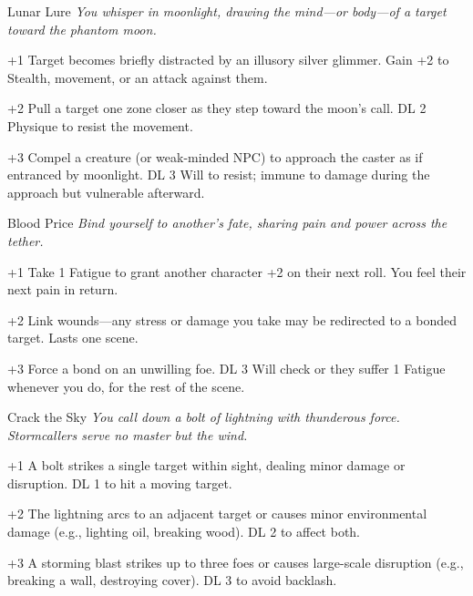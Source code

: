\begin{WyrdSpell}[Astral]{Lunar Lure}\label{spell:lunar-lure}
    \textit{You whisper in moonlight, drawing the mind—or body—of a target toward the phantom moon.}
    
    \begin{WyrdSpellBlock}
        \item[+1] Target becomes briefly distracted by an illusory silver glimmer. Gain +2 to Stealth, movement, or an attack against them.
        
        \item[+2] Pull a target one zone closer as they step toward the moon’s call. DL 2 Physique to resist the movement.
        
        \item[+3] Compel a creature (or weak-minded NPC) to approach the caster as if entranced by moonlight. DL 3 Will to resist; immune to damage during the approach but vulnerable afterward.
    \end{WyrdSpellBlock}
\end{WyrdSpell}

\begin{WyrdSpell}[Bloodbinding]{Blood Price}
\textit{Bind yourself to another’s fate, sharing pain and power across the tether.}
    \begin{WyrdSpellBlock}
        \item[+1] Take 1 Fatigue to grant another character +2 on their next roll. You feel their next pain in return.
        \item[+2] Link wounds—any stress or damage you take may be redirected to a bonded target. Lasts one scene.
        \item[+3] Force a bond on an unwilling foe. DL 3 Will check or they suffer 1 Fatigue whenever you do, for the rest of the scene.
    \end{WyrdSpellBlock}
\end{WyrdSpell}

\begin{WyrdSpell}[Stormcalling]{Crack the Sky}
\textit{You call down a bolt of lightning with thunderous force. Stormcallers serve no master but the wind.}
    \begin{WyrdSpellBlock}
        \item[+1] A bolt strikes a single target within sight, dealing minor damage or disruption. DL 1 to hit a moving target.
        \item[+2] The lightning arcs to an adjacent target or causes minor environmental damage (e.g., lighting oil, breaking wood). DL 2 to affect both.
        \item[+3] A storming blast strikes up to three foes or causes large-scale disruption (e.g., breaking a wall, destroying cover). DL 3 to avoid backlash.
    \end{WyrdSpellBlock}
\end{WyrdSpell}


